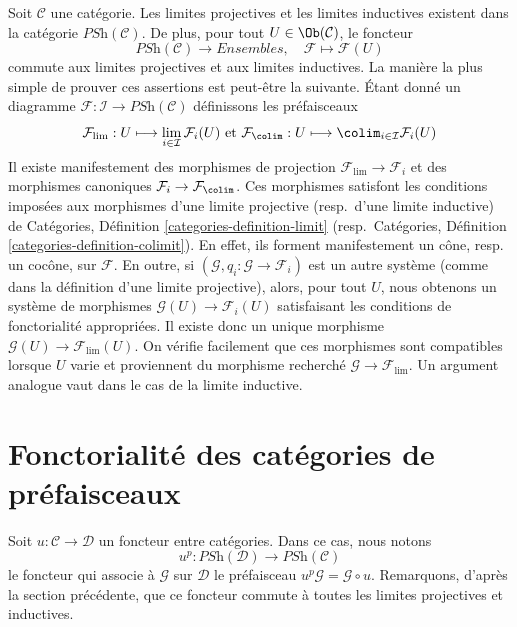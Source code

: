 \noindent
Soit $\mathcal{C}$ une catégorie.
Les limites projectives et les limites inductives existent dans la catégorie
$\textit{PSh}(\mathcal{C})$. De plus, pour tout
$U \in \Ob(\mathcal{C})$, le foncteur
$$
\textit{PSh}(\mathcal{C})
\longrightarrow
\textit{Ensembles}, \quad
\mathcal{F}
\longmapsto
\mathcal{F}(U)
$$
commute aux limites projectives et aux limites inductives. La manière la plus simple
de prouver ces assertions est peut-être la suivante. Étant donné un diagramme
$
\mathcal{F} :
\mathcal{I}
\to
\textit{PSh}(\mathcal{C})
$
définissons les préfaisceaux
$$
\mathcal{F}_{\lim} :
U
\longmapsto
\lim_{i \in \mathcal{I}} \mathcal{F}_i(U)
\text{  et  }
\mathcal{F}_{\colim} :
U
\longmapsto
\colim_{i \in \mathcal{I}} \mathcal{F}_i(U)
$$
Il existe manifestement des morphismes de projection $\mathcal{F}_{\lim} \to \mathcal{F}_i$
et des morphismes canoniques $\mathcal{F}_i \to \mathcal{F}_{\colim}$. Ces
morphismes satisfont les conditions imposées aux morphismes d’une limite projective
(resp.\ d’une limite inductive) de Catégories, Définition \ref{categories-definition-limit}
(resp.\ Catégories, Définition \ref{categories-definition-colimit}).
En effet, ils forment manifestement un cône, resp. un cocône, sur $\mathcal{F}$.
En outre, si $(\mathcal{G}, q_i : \mathcal{G} \to \mathcal{F}_i)$
est un autre
système (comme dans la définition d’une limite projective), alors, pour tout
$U$, nous obtenons un système de morphismes $\mathcal{G}(U) \to \mathcal{F}_i(U)$
satisfaisant les conditions de fonctorialité appropriées. Il existe donc un unique
morphisme $\mathcal{G}(U) \to \mathcal{F}_{\lim}(U)$. On vérifie facilement
que ces morphismes sont compatibles lorsque $U$ varie et proviennent du
morphisme recherché $\mathcal{G} \to \mathcal{F}_{\lim}$.
Un argument analogue vaut dans le cas de la limite inductive.





















\section{Fonctorialité des catégories de préfaisceaux}
\label{section-functoriality-PSh}

\noindent
Soit $u : \mathcal{C} \to \mathcal{D}$ un foncteur entre catégories.
Dans ce cas, nous notons
$$
u^p :
\textit{PSh}(\mathcal{D})
\longrightarrow
\textit{PSh}(\mathcal{C})
$$
le foncteur qui associe à $\mathcal{G}$ sur $\mathcal{D}$ le préfaisceau
$u^p\mathcal{G} = \mathcal{G} \circ u$. Remarquons, d’après la section précédente,
que ce foncteur commute à toutes les limites projectives et inductives.

